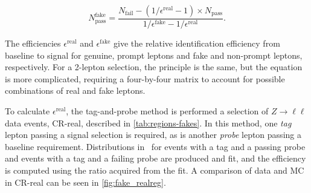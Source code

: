 \begin{equation}
N_{\text{pass}}^{\text{fake}} = \frac{N_{\text{fail}} - (1/\epsilon^{\text{real}} - 1) \times N_{\text{pass}} }{1/\epsilon^{\text{fake}} - 1/\epsilon^{\text{real}}}.
\end{equation}

The efficiencies $\epsilon^\text{real}$ and $\epsilon^\text{fake}$ give the relative identification efficiency from baseline to signal for genuine, prompt leptons and fake and non-prompt leptons, respectively. For a 2-lepton selection, the principle is the same, but the equation is more complicated, requiring a four-by-four matrix to account for possible combinations of real and fake leptons. 


To calculate $\epsilon^\text{real}$, the tag-and-probe method is performed a selection of $Z\rightarrow\ell\ell$ data events, CR-real, described in \autoref{tab:regions-fakes}. In this method, one \textit{tag} lepton passing a signal selection is required, as is another \textit{probe} lepton passing a baseline requirement. Distributions in \mll~for events with a tag and a passing probe and events with a tag and a failing probe are produced and fit, and the efficiency is computed using the ratio acquired from the fit. A comparison of data and \ac{MC} in CR-real can be seen in \autoref{fig:fake_realreg}.
 
\begin{table}[htbp]

\begin{center}
 \caption{Control regions used to measure efficiencies of real and fake leptons. 
 The flavour combination of the dilepton pair is denoted as either ``SF'' for same-flavour or ``DF'' for different flavour.
The charge combination of the leading lepton pairs are given as ``SS'' for same-sign or ``OS'' for opposite-sign.}
\label{tab:regions-fakes}
\end{center}
\end{table}

